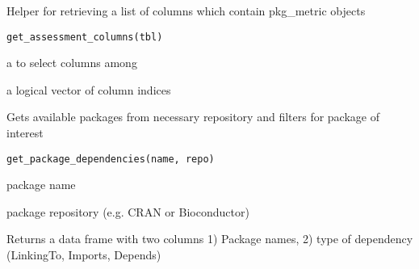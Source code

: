 \documentclass[a4paper]{book}
\begin{document}
%
\begin{Description}
Helper for retrieving a list of columns which contain pkg\_metric objects
\end{Description}
%
\begin{Usage}
\begin{verbatim}
get_assessment_columns(tbl)
\end{verbatim}
\end{Usage}
%
\begin{Arguments}
\begin{ldescription}
\item[\code{tbl}] a  to select columns among
\end{ldescription}
\end{Arguments}
%
\begin{Value}
a logical vector of  column indices
\end{Value}
%
\begin{Description}
Gets available packages from necessary repository and filters for
package of interest
\end{Description}
%
\begin{Usage}
\begin{verbatim}
get_package_dependencies(name, repo)
\end{verbatim}
\end{Usage}
%
\begin{Arguments}
\begin{ldescription}
\item[\code{name}] package name

\item[\code{repo}] package repository (e.g. CRAN or Bioconductor)
\end{ldescription}
\end{Arguments}
%
\begin{Value}
Returns a data frame with two columns 1) Package names, 2) type of dependency (LinkingTo, Imports, Depends)
\end{Value}
\end{document}
